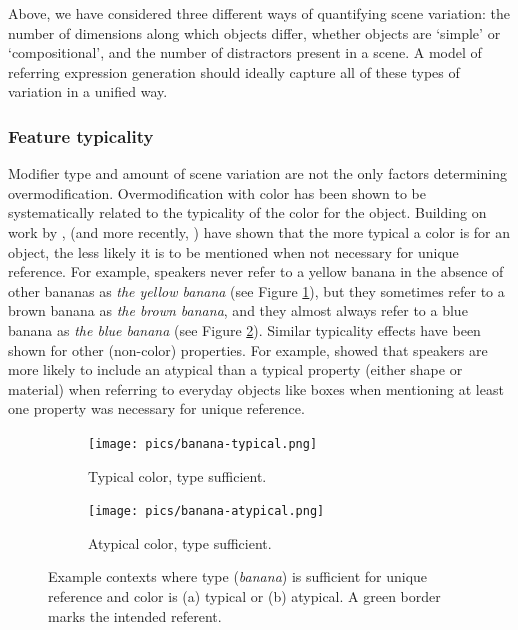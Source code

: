 \documentclass[11pt]{article}
\newcommand{\figref}[1]{Figure \ref{#1}}
\begin{document}
Above, we have considered three different ways of quantifying scene variation: the number of dimensions along which objects differ, whether objects are `simple' or `compositional', and the number of distractors present in a scene. A model of referring expression generation should ideally capture all of these types of variation in a unified way. 



\subsubsection{Feature typicality}
\label{sec:colortypicalityintro}

Modifier type and amount of scene variation are not the only factors determining overmodification. Overmodification with color has been shown to be systematically related to the typicality of the color for the object. Building on work by ,  (and more recently, ) have shown that the more typical a color is for an object, the less likely it is to be mentioned when not necessary for unique reference. For example, speakers never refer to a yellow banana in the absence of other bananas as \emph{the yellow banana} (see \figref{fig:typical}), but they sometimes refer to a brown banana as \emph{the brown banana}, and they almost always refer to a blue banana as \emph{the blue banana} (see \figref{fig:atypical}). Similar typicality effects have been shown for other (non-color) properties. For example,  showed that speakers are more likely to include an atypical than a typical property (either shape or material) when referring to everyday objects like boxes when mentioning at least one property was necessary for unique reference. 

\begin{figure}
\begin{subfigure}{.5\textwidth}
\texttt{[image: pics/banana-typical.png]}
\caption{Typical color, type sufficient.}
\label{fig:typical}
\end{subfigure}
\begin{subfigure}{.5\textwidth}
\texttt{[image: pics/banana-atypical.png]}
\caption{Atypical color, type sufficient.}
\label{fig:atypical}
\end{subfigure}
\caption{Example contexts where type (\emph{banana}) is sufficient for unique reference and color is (a) typical or (b) atypical. A green border marks the intended referent.}
\label{fig:banana}
\end{figure}
\end{document}
